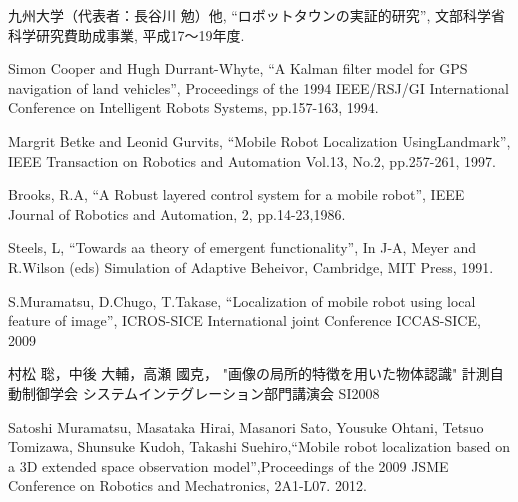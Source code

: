 \begin{thebibliography}{99}
九州大学（代表者：長谷川 勉）他, ``ロボットタウンの実証的研究'', 文部科学省 科学研究費助成事業, 平成17〜19年度.

Simon Cooper and Hugh Durrant-Whyte, 
``A Kalman filter model for GPS navigation of land vehicles'',
 Proceedings of the 1994 IEEE/RSJ/GI International Conference on Intelligent Robots Systems, pp.157-163, 1994.

Margrit Betke and Leonid Gurvits, 
``Mobile Robot Localization UsingLandmark'', 
IEEE Transaction on Robotics and Automation Vol.13, No.2, pp.257-261, 1997.

Brooks, R.A, ``A Robust layered control system for a mobile robot'', IEEE Journal of Robotics and Automation, 2, pp.14-23,1986.

Steels, L, ``Towards aa theory of emergent functionality'', In J-A, Meyer and R.Wilson (eds) Simulation of Adaptive Beheivor, Cambridge, MIT Press, 1991.

\newblock S.Muramatsu, D.Chugo, T.Takase,
``Localization of mobile robot using local feature of image'',
\newblock ICROS-SICE International joint Conference ICCAS-SICE, 2009

\newblock 村松 聡，中後 大輔，高瀬 國克，
"画像の局所的特徴を用いた物体認識"
\newblock 計測自動制御学会 システムインテグレーション部門講演会 SI2008

Satoshi Muramatsu, Masataka Hirai, Masanori Sato, Yousuke Ohtani, Tetsuo Tomizawa, Shunsuke Kudoh, Takashi Suehiro,``Mobile robot localization based on a 3D extended space observation model'',Proceedings of the 2009 JSME Conference on Robotics and Mechatronics, 2A1-L07. 2012.
\fi
\end{thebibliography}

